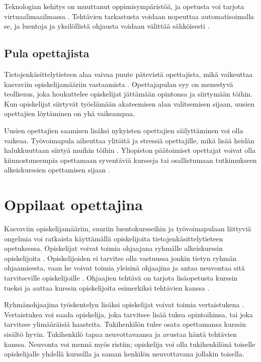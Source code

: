 \documentclass[finnish]{tktltiki2}
\theoremstyle{definition}
\theoremstyle{remark}
\begin{document}
Teknologian kehitys on muuttanut oppimisympäristöä, ja opetusta voi tarjota virtuaalimaailmassa \cite{Yadin11}. Tehtävien tarkastusta voidaan nopeuttaa automatisoimalla se, ja luentoja ja yksilöllistä ohjausta voidaan välittää sähköisesti \cite{Jimenez-Periz00}. \par



\subsection{Pula opettajista}
Tietojenkäsittelytieteen alaa vaivaa puute pätevistä opettajista, mikä vaikeuttaa kasvaviin opiskelijamääriin vastaamista \cite{Roberts99}. Opettajapulan syy on menestyvä teollisuus, joka houkuttelee opiskelijat jättämään opintonsa ja siirtymään töihin. Kun opiskelijat siirtyvät työelämään akateemisen alan valitsemisen sijaan, uusien opettajien löytäminen on yhä vaikeampaa. \par

Uusien opettajien saamisen lisäksi nykyisten opettajien säilyttäminen voi olla vaikeaa. Työ\-voi\-ma\-pu\-la aiheuttaa ylitöitä ja stressiä opettajille, mikä lisää heidän halukkuuttaan siirtyä muihin töihin \cite{Roberts99}. Yliopiston päätoimiset opettajat voivat olla kiinnostuneempia opettamaan syventäviä kursseja tai osallistumaan tutkimukseen alkeiskurssien opettamisen sijaan \cite{Shannon98}. \par




\section{Oppilaat opettajina}
Kasvaviin opiskelijamääriin, suuriin luentokursseihin ja työvoimapulaan liittyviä ongelmia voi ratkaista käyttämällä opiskelijoita tietojenkäsittelytieteen opetuksessa. Opiskelijat voivat toimia ohjaajana ryhmälle alkeiskurssin o\-pis\-ke\-li\-joi\-ta \cite{Reges88}. Opiskelijoiden ei tarvitse olla vastuussa jonkin tietyn ryhmän ohjaamisesta, vaan he voivat toimia yleisinä ohjaajina ja antaa neuvontaa sitä tarvitseville opiskelijoille \cite{Vikberg, Vihavainen}. Ohjaajien tehtävä on tarjota lisäopetusta kurssin tueksi ja auttaa kurssin opiskelijoita esimerkiksi tehtävien kanssa \cite{Patitsas12_3}. \par

Ryhmänohjaajina työskentelyn lisäksi opiskelijat voivat toimia vertaistukena \cite{Tashakkori05}. Vertaistukea voi saada opiskelija, joka tarvitsee lisää tukea opintoihinsa, tai joka tarvitsee ylimääräisiä haasteita. Tukihenkilön tulee osata opettamansa kurssin sisältö hyvin. Tukihenkilö tapaa neuvottavaansa ja avustaa häntä tehtävien kanssa. Neuvonta voi mennä myös ristiin; opiskelija voi olla tukihenkilönä toiselle opiskelijalle yhdellä kurssilla ja saman henkilön neuvottavana jollakin toisella. \par
\end{document}
